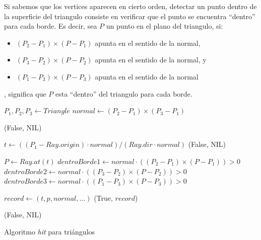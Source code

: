 
Si sabemos que los vertices aparecen en cierto orden, detectar un punto dentro de
la superficie del triangulo consiste en verificar que el punto se encuentra ``dentro''
para cada borde. Es decir, sea $P$ un punto en el plano del triangulo, si:

\begin{itemize}
    \item $(P_2 - P_1) \times (P - P_1)$ apunta en el sentido de la normal,
    \item $(P_3 - P_2) \times (P - P_2)$ apunta en el sentido de la normal, y
    \item $(P_1 - P_3) \times (P - P_3)$ apunta en el sentido de la normal
\end{itemize}

, significa que $P$ esta ``dentro'' del triangulo para cada borde.

\begin{algorithm}[H]
\begin{algorithmic}[1]
    \State $P_1, P_2, P_3 \gets Triangle$ 
    \State $normal \gets (P_2 - P_1) \times (P_3 - P_1)$

        \State \Return (False, NIL) 
    \EndIf

    \State $t \gets ((P_1 - Ray.origin) \cdot normal) / (Ray.dir \cdot normal)$
        \State \Return (False, NIL)
    \EndIf

    \State $P \gets Ray.at(t)$ 
    \State $dentroBorde1 \gets normal \cdot ((P_2 - P_1) \times (P - P_1)) > 0$
    \State $dentroBorde2 \gets normal \cdot ((P_3 - P_2) \times (P - P_2)) > 0$
    \State $dentroBorde3 \gets normal \cdot ((P_1 - P_3) \times (P - P_3)) > 0$


        \State $record \gets (t, p, normal, \dots)$
        \State \Return (True, $record$)
    \EndIf

    \State \Return (False, NIL)
\EndFunction
\end{algorithmic}
\caption{Algoritmo \textit{hit} para triángulos}
\label{alg:triangle-hit}
\end{algorithm}

